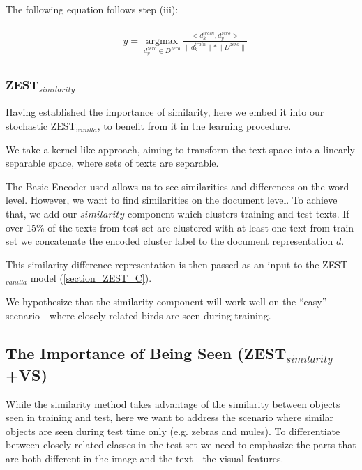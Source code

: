 \documentclass[11pt,a4paper]{article}
\begin{document}
The following equation follows step (iii):

\begin{equation}
\begin{aligned}
\begin{split}
&y=\operatorname*{argmax}_{d_y^{zero}\in D^{zero}} \frac{<d^{train}_k,d_y^{zero}>}{\| d_k^{train}\| *\| D^{zero}\| } %
\end{split}
\end{aligned}
\end{equation}

\subsubsection{ZEST$_{similarity}$}

Having established the importance of similarity, here we embed it into our stochastic ZEST$_{vanilla}$, to benefit from it in the learning procedure. \par

We take a kernel-like approach, aiming to transform the text space into a linearly separable space, where sets of texts are separable. \par

The Basic Encoder used allows us to see similarities and differences on the word-level. However, we want to find similarities on the document level. To achieve that, we add our $similarity$ component which clusters training and test texts. If over 15\% of the texts from test-set are clustered with at least one text from train-set we concatenate the encoded cluster label to the document representation $d$. \par

This similarity-difference representation is then passed as an input to the ZEST$_{vanilla}$ model (\ref{section_ZEST_C}). \par

We hypothesize that the similarity component will work well on the \enquote{easy} scenario - where closely related birds are seen during training. \par

\subsection{The Importance of Being Seen (ZEST$_{similarity}$+VS)}

While the similarity method takes advantage of the similarity between objects seen in training and test, here we want to address the scenario where similar objects are seen during test time only (e.g. zebras and mules). To differentiate between closely related classes in the test-set we need to emphasize the parts that are both different in the image and the text - the visual features. \par
\end{document}
